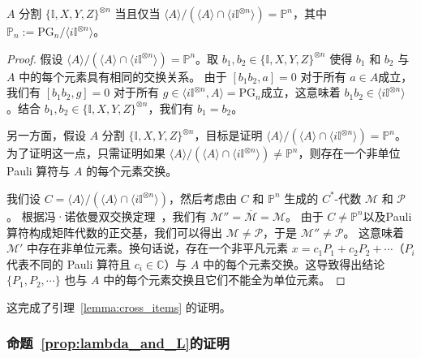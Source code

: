     
\begin{lemma}\label{ap:lemma:split_generate}
    $A$ 分割 $\{\mathbb{I},X,Y,Z\}^{\otimes n}$ 当且仅当 $\langle A\rangle/\left(\langle A\rangle\cap\langle i\mathbb{I}^{\otimes n}\rangle\right)=\mathbb{P}^n$，其中 $\mathbb{P}_n:=\mathrm{PG}_n/\langle i\mathbb{I}^{\otimes n}\rangle$。
\end{lemma}
\begin{proof}
    假设 $\langle A\rangle/\left(\langle A\rangle\cap\langle i\mathbb{I}^{\otimes n}\rangle\right)=\mathbb{P}^n$。取 $b_1,b_2\in \{\mathbb{I},X,Y,Z\}^{\otimes n}$ 使得 $b_1$ 和 $b_2$ 与 $A$ 中的每个元素具有相同的交换关系。
    由于 $\left[b_1b_2,a\right]=0$ 对于所有 $a\in A$成立，我们有 $\left[b_1b_2,g\right]=0$ 对于所有 $g\in\langle i\mathbb{I}^{\otimes n},A\rangle=\mathrm{PG}_n$成立，这意味着 $b_1b_2\in\langle i\mathbb{I}^{\otimes n}\rangle$。结合 $b_1,b_2\in \{\mathbb{I},X,Y,Z\}^{\otimes n}$，我们有 $b_1=b_2$。
    
    另一方面，假设 $A$ 分割 $\{\mathbb{I},X,Y,Z\}^{\otimes n}$，目标是证明 $\langle A\rangle/\left(\langle A\rangle\cap\langle i\mathbb{I}^{\otimes n}\rangle\right)=\mathbb{P}^n$。
    为了证明这一点，只需证明如果 $\langle A\rangle/\left(\langle A\rangle\cap\langle i\mathbb{I}^{\otimes n}\rangle\right)\neq\mathbb{P}^n$，则存在一个非单位 Pauli 算符与 $A$ 的每个元素交换。
    
    我们设 $C=\langle A\rangle/\left(\langle A\rangle\cap\langle i\mathbb{I}^{\otimes n}\rangle\right)$，然后考虑由 $C$ 和 $\mathbb{P}^n$ 生成的 $C^*$-代数 $\mathcal{M}$ 和 $\mathcal{P}$。
    根据冯·诺依曼双交换定理~\cite{kadison1986fundamentals}，我们有 $\mathcal{M}''=\overline{\mathcal{M}}=\mathcal{M}$。
    由于 $C\neq\mathbb{P}^n$以及Pauli 算符构成矩阵代数的正交基，我们可以得出 $\mathcal{M}\neq \mathcal{P}$，于是 $\mathcal{M}''\neq \mathcal{P}$。
    这意味着 $\mathcal{M}'$ 中存在非单位元素。换句话说，存在一个非平凡元素 $x=c_1P_1+c_2P_2+\cdots$（$P_i$ 代表不同的 Pauli 算符且 $c_i\in \mathbb{C}$）与 $A$ 中的每个元素交换。这导致得出结论 $\{P_1,P_2,\cdots\}$ 也与 $A$ 中的每个元素交换且它们不能全为单位元素。
\end{proof}
    
这完成了引理~\ref{lemma:cross_items} 的证明。

\subsubsection{命题~\ref{prop:lambda_and_L}的证明}